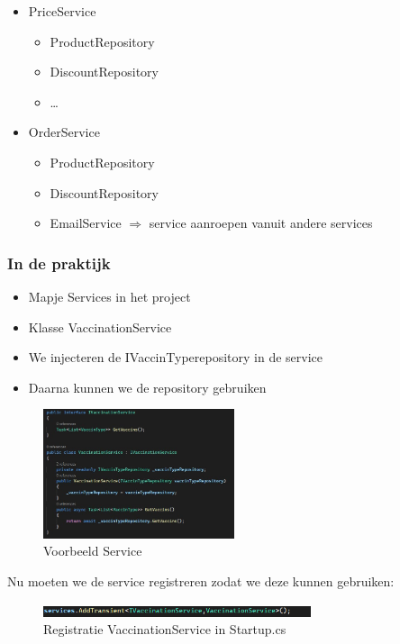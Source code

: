 \documentclass{article}
\begin{document}
\begin{itemize}
    \item PriceService
    \begin{itemize}
        \item ProductRepository
        \item DiscountRepository
        \item \dots
    \end{itemize}
    \item OrderService
    \begin{itemize}
        \item ProductRepository
        \item DiscountRepository
        \item EmailService $\Rightarrow$ service aanroepen vanuit andere services
    \end{itemize}
\end{itemize}

\subsubsection{In de praktijk}

\begin{itemize}
    \item Mapje Services in het project
    \item Klasse VaccinationService
    \item We injecteren de IVaccinTyperepository in de service
    \item Daarna kunnen we de repository gebruiken
\end{itemize}

\begin{figure}[H]
    \centering
    \includegraphics[width=0.5\textwidth]{services-1.png}
    \caption{Voorbeeld Service}
\end{figure}

Nu moeten we de service registreren zodat we deze kunnen gebruiken:

\begin{figure}[H]
    \centering
    \includegraphics[width=0.7\textwidth]{services-2.png}
    \caption{Registratie VaccinationService in Startup.cs}
\end{figure}
\end{document}
